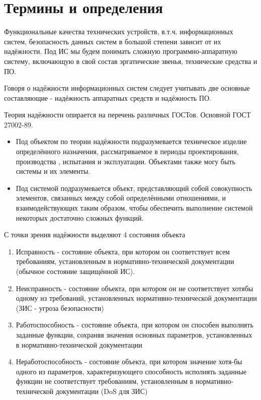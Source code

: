 \documentclass[a4paper, 12pt]{extarticle}
\begin{document}
		\def \nocredits {}
		\def \LineC {Конспект по дисциплине}
		\def \LineD {Защищённые информационные системы}
		\def \LineE {}
		\def \LineF {}
		\def \LineG {}
		\def \LineH {}

\maketitle

	\section{Термины и определения}

		Функциональные качества  технических устройств, в.т.ч. информационных систем, безопасность данных систем в большой степени зависит от их надёжности.
		Под ИС мы будем понимать сложную программно-аппаратную систему, включающую в свой состав эргатические звенья, технические средства и ПО.

		Говоря о надёжности информационных систем следует учитывать две основные составляющие - надёжность аппаратных средств и надёжность ПО.

		Теория надёжности опирается на перечень различных ГОСТов. Основной ГОСТ 27002-89.
		\begin{itemize}
			\item Под объектом по теории надёжности подразумевается техническое изделие определённого назначения, рассматриваемое в периоды проектирования, производства , испытания и эксплуатации. Объектами также могу быть системы и их элементы.
			\item Под системой подразумевается объект, представляющий собой совокупность элементов, связанных между собой определёнными отношениями, и взаимодействующих таким образом, чтобы обеспечить выполнение системой некоторых достаточно сложных функций.
		\end{itemize}

		С точки зрения надёжности выделяют 4 состояния объекта
		\begin{enumerate}
			\item Исправность - состояние объекта, при котором он соответствует всем требованиям, установленным в нормативно-технической документации (обычное состояние защищённой ИС).
			\item Неисправность - состояние объекта, при котором он не соответствует хотябы одному из требований, установленных нормативно-технической документации (ЗИС - угроза безопасности)
			\item Работоспособность - состояние объекта, при котором он способен выполнять заданные функции, сохраняя значения основных параметров, установленных в нормативно-технической документации
			\item Неработоспособность - состояние объекта, при котором значение хотя-бы одного из параметров, характеризующего способность исполнять заданные функции не соответствует требованиям, установленным в нормативно-технической документации (DoS для ЗИС)
		\end{enumerate}
\end{document}
